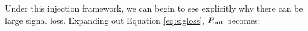 \documentclass[preprint2,numberedappendix,tighten]{aastex6}  %
\newcommand{\x}{\mathbf{x}}
\newcommand{\f}{\mathbf{f}}
\newcommand{\s}{\mathbf{s}}
\newcommand{\p}{\mathbf{p}}
\newcommand{\phat}{\widehat{\mathbf{p}}}
\newcommand{\cc}[1]{{\color{purple} \textbf{[CC: #1]}}}
\begin{document}

Under this injection framework, we can begin to see explicitly why there can be large signal loss. Expanding out Equation \eqref{eq:sigloss}, $P_{\rm out}$ becomes:

%
%
\end{document}
